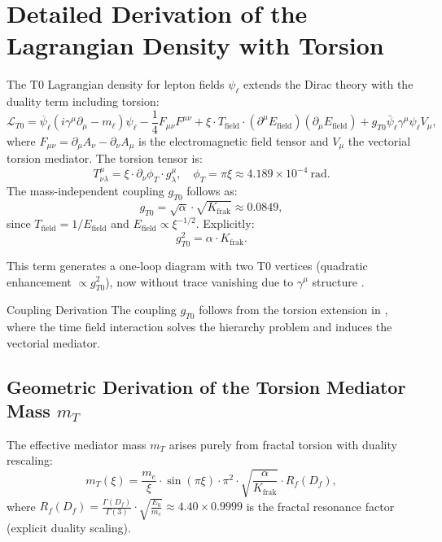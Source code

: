 \documentclass[12pt,a4paper]{article}
\begin{document}
	\section{Detailed Derivation of the Lagrangian Density with Torsion}
	The T0 Lagrangian density for lepton fields $\psi_\ell$ extends the Dirac theory with the duality term including torsion:
	\begin{equation}
		\mathcal{L}_{T0} = \overline{\psi}_\ell (i \gamma^\mu \partial_\mu - m_\ell) \psi_\ell - \frac{1}{4} F_{\mu\nu} F^{\mu\nu} + \xi \cdot T_{\text{field}} \cdot (\partial^\mu E_{\text{field}}) (\partial_\mu E_{\text{field}}) + g_{T0} \bar{\psi}_\ell \gamma^\mu \psi_\ell V_\mu,
	\end{equation}
	where $F_{\mu\nu} = \partial_\mu A_\nu - \partial_\nu A_\mu$ is the electromagnetic field tensor and $V_\mu$ the vectorial torsion mediator. The torsion tensor is:
	\begin{equation}
		T^\mu_{\nu\lambda} = \xi \cdot \partial_\nu \phi_T \cdot g_{\lambda}^\mu, \quad \phi_T = \pi \xi \approx 4.189 \times 10^{-4}\ \text{rad}.
	\end{equation}
	The mass-independent coupling $g_{T0}$ follows as:
	\begin{equation}
		g_{T0} = \sqrt{\alpha} \cdot \sqrt{K_{\text{frak}}} \approx 0.0849,
	\end{equation}
	since $T_{\text{field}} = 1 / E_{\text{field}}$ and $E_{\text{field}} \propto \xi^{-1/2}$. Explicitly:
	\begin{equation}
		g_{T0}^2 = \alpha \cdot K_{\text{frak}}.
	\end{equation}
	
	This term generates a one-loop diagram with two T0 vertices (quadratic enhancement $\propto g_{T0}^2$), now without trace vanishing due to $\gamma^\mu$ structure \cite{bell_muon}.
	
	\begin{derivation}{Coupling Derivation}
		The coupling $g_{T0}$ follows from the torsion extension in \cite{QFT_T0}, where the time field interaction solves the hierarchy problem and induces the vectorial mediator.
	\end{derivation}
	
	\subsection{Geometric Derivation of the Torsion Mediator Mass $m_T$}
	The effective mediator mass $m_T$ arises purely from fractal torsion with duality rescaling:
	\begin{equation}
		m_T(\xi) = \frac{m_e}{\xi} \cdot \sin(\pi \xi) \cdot \pi^2 \cdot \sqrt{\frac{\alpha}{K_{\text{frak}}}} \cdot R_f(D_f),
	\end{equation}
	where $R_f(D_f) = \frac{\Gamma(D_f)}{\Gamma(3)} \cdot \sqrt{\frac{E_0}{m_e}} \approx 4.40 \times 0.9999$ is the fractal resonance factor (explicit duality scaling).
	
\end{document}
